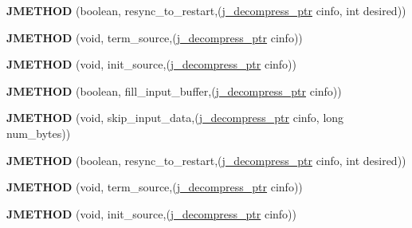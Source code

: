 \begin{DoxyCompactItemize}
{\bfseries J\+M\+E\+T\+H\+OD} (boolean, resync\+\_\+to\+\_\+restart,(\hyperlink{structjpeg__decompress__struct}{j\+\_\+decompress\+\_\+ptr} cinfo, int desired))
\item 
\mbox{\label{structjpeg__source__mgr_a6c0683ce1166b9ee659b2d3aa1efb1c2}} 
{\bfseries J\+M\+E\+T\+H\+OD} (void, term\+\_\+source,(\hyperlink{structjpeg__decompress__struct}{j\+\_\+decompress\+\_\+ptr} cinfo))
\item 
\mbox{\label{structjpeg__source__mgr_af8fda02c19c9dc4e505daabb77c3ad81}} 
{\bfseries J\+M\+E\+T\+H\+OD} (void, init\+\_\+source,(\hyperlink{structjpeg__decompress__struct}{j\+\_\+decompress\+\_\+ptr} cinfo))
\item 
\mbox{\label{structjpeg__source__mgr_ab4a579b1f50108e2de73c7c0c1bbb9fd}} 
{\bfseries J\+M\+E\+T\+H\+OD} (boolean, fill\+\_\+input\+\_\+buffer,(\hyperlink{structjpeg__decompress__struct}{j\+\_\+decompress\+\_\+ptr} cinfo))
\item 
\mbox{\label{structjpeg__source__mgr_a3e29df8ddadb0c15e54b69b5a7a10305}} 
{\bfseries J\+M\+E\+T\+H\+OD} (void, skip\+\_\+input\+\_\+data,(\hyperlink{structjpeg__decompress__struct}{j\+\_\+decompress\+\_\+ptr} cinfo, long num\+\_\+bytes))
\item 
\mbox{\label{structjpeg__source__mgr_a60a35ccd1fb8d954f34c0cdbf29ac010}} 
{\bfseries J\+M\+E\+T\+H\+OD} (boolean, resync\+\_\+to\+\_\+restart,(\hyperlink{structjpeg__decompress__struct}{j\+\_\+decompress\+\_\+ptr} cinfo, int desired))
\item 
\mbox{\label{structjpeg__source__mgr_a6c0683ce1166b9ee659b2d3aa1efb1c2}} 
{\bfseries J\+M\+E\+T\+H\+OD} (void, term\+\_\+source,(\hyperlink{structjpeg__decompress__struct}{j\+\_\+decompress\+\_\+ptr} cinfo))
\item 
\mbox{\label{structjpeg__source__mgr_af8fda02c19c9dc4e505daabb77c3ad81}} 
{\bfseries J\+M\+E\+T\+H\+OD} (void, init\+\_\+source,(\hyperlink{structjpeg__decompress__struct}{j\+\_\+decompress\+\_\+ptr} cinfo))
\item 
\mbox{\label{structjpeg__source__mgr_ab4a579b1f50108e2de73c7c0c1bbb9fd}} 

\end{DoxyCompactItemize}
